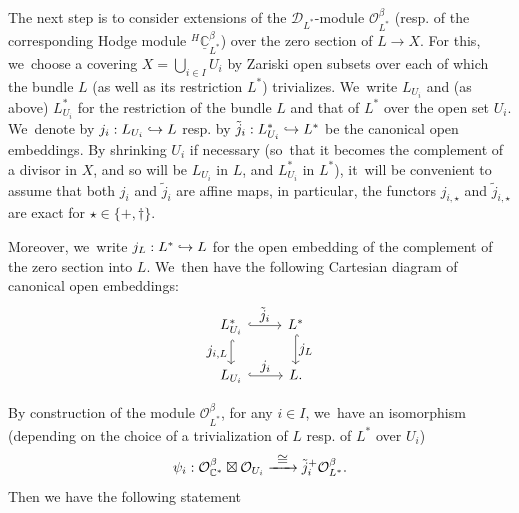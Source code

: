 \documentclass[11pt]{article}
\newcommand{\resp}{resp.\xspace}
\newcommand{\skpt}{\smallskip}
\let\mathds\mathbb
\let\ts\textstyle
\newcommand\hto{\mathrel{\lhook\joinrel\to}}
\newcommand{\To}[1]{\mathchoice{\xrightarrow{\textstyle\kern4pt#1\kern3pt}}{\xrightarrow{\,#1\,}}{}{}}
\newcommand{\dC}{{\mathds C}}\let\C\dC
\newcommand{\cD}{\mathscr{D}}
\newcommand{\cO}{\mathcal{O}}\let\O\cO
\begin{document}
The next step is to consider extensions of the $\cD_{L^*}$\nobreakdash-mod\-ule $\cO^\beta_{L^*}$ (\resp of the corresponding Hodge module $^{H\!}\underline{\dC}^\beta_{L^*}$) over the zero section of $L\to X$. For this, we~choose a covering
$X=\bigcup_{i\in I} U_i$ by Zariski open subsets over each of which the bundle $L$ (as well as its restriction $L^*$) trivializes. We~write $L_{U_i}$ and (as above) $L^*_{U_i}$ for the restriction of the bundle $L$ and that of $L^*$ over the open set $U_i$. We~denote by $j_i:L_{U_i}\hto L$ \resp by
$\tilde{j}_i:L^*_{U_i}\hto L^*$ be the canonical open embeddings.
By shrinking $U_i$ if necessary (so~that it becomes the complement of a divisor in $X$, and so will be $L_{U_i}$ in $L$, and $L^*_{U_i}$ in $L^*$), it~will be convenient to assume that both $j_i$ and $\tilde{j}_i$ are affine maps, in particular, the functors $j_{i,\star}$ and $\tilde{j}_{i,\star}$ are exact for $\star\in\{+,\dag\}$.

Moreover, we~write $j_L:L^*\hto L$ for the open embedding of the complement of the zero section into $L$. We~then have the following Cartesian diagram of canonical open embeddings:
\begin{equation}\label{diag:ExtObetaOpenSubs}
\begin{tikzcd}
L^*_{U_i} \ar[hook]{r}{\ts\tilde{j}_i} \arrow[hook, d, "\ts \ts j_{i,L}"']
& L^* \ar[hook]{d}{\ts j_L} \\
L_{U_i} \ar[hook]{r}{\ts j_i} & L.
\end{tikzcd}
\end{equation}

By construction of the module $\cO^\beta_{L^*}$, for any $i\in I$, we~have an isomorphism
(depending on the choice of a trivialization of $L$ \resp of $L^*$ over $U_i$)
\[
\psi_i: \cO^\beta_{\dC^*}\boxtimes\cO_{U_i} \To{\cong} \tilde{j}_i^+ \cO_{L^*}^\beta.
\]
Then we have the following statement

\skpt
\end{document}
